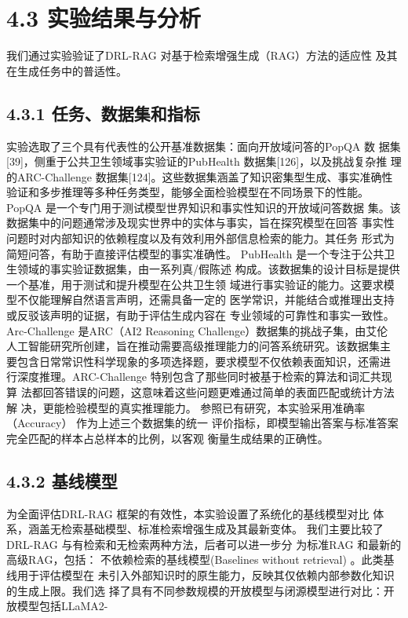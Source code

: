 \documentclass[12pt,a4paper,openright,UTF8]{ctexbook}
\begin{document}
\section{4.3 实验结果与分析}

我们通过实验验证了DRL-RAG 对基于检索增强生成（RAG）方法的适应性 及其在生成任务中的普适性。

\subsection{4.3.1 任务、数据集和指标}

实验选取了三个具有代表性的公开基准数据集：面向开放域问答的PopQA 数 据集[39]，侧重于公共卫生领域事实验证的PubHealth 数据集[126]，以及挑战复杂推 理的ARC-Challenge 数据集[124]。这些数据集涵盖了知识密集型生成、事实准确性 验证和多步推理等多种任务类型，能够全面检验模型在不同场景下的性能。 PopQA 是一个专门用于测试模型世界知识和事实性知识的开放域问答数据 集。该数据集中的问题通常涉及现实世界中的实体与事实，旨在探究模型在回答 事实性问题时对内部知识的依赖程度以及有效利用外部信息检索的能力。其任务 形式为简短问答，有助于直接评估模型的事实准确性。 PubHealth 是一个专注于公共卫生领域的事实验证数据集，由一系列真/假陈述 构成。该数据集的设计目标是提供一个基准，用于测试和提升模型在公共卫生领 域进行事实验证的能力。这要求模型不仅能理解自然语言声明，还需具备一定的 医学常识，并能结合或推理出支持或反驳该声明的证据，有助于评估生成内容在 专业领域的可靠性和事实一致性。 Arc-Challenge 是ARC（AI2 Reasoning Challenge）数据集的挑战子集，由艾伦 人工智能研究所创建，旨在推动需要高级推理能力的问答系统研究。该数据集主 要包含日常常识性科学现象的多项选择题，要求模型不仅依赖表面知识，还需进 行深度推理。ARC-Challenge 特别包含了那些同时被基于检索的算法和词汇共现算 法都回答错误的问题，这意味着这些问题更难通过简单的表面匹配或统计方法解 决，更能检验模型的真实推理能力。 参照已有研究，本实验采用准确率（Accuracy） 作为上述三个数据集的统一 评价指标，即模型输出答案与标准答案完全匹配的样本占总样本的比例，以客观 衡量生成结果的正确性。

\subsection{4.3.2 基线模型}

为全面评估DRL-RAG 框架的有效性，本实验设置了系统化的基线模型对比 体系，涵盖无检索基础模型、标准检索增强生成及其最新变体。 我们主要比较了DRL-RAG 与有检索和无检索两种方法，后者可以进一步分 为标准RAG 和最新的高级RAG，包括： 不依赖检索的基线模型(Baselines without retrieval) 。此类基线用于评估模型在 未引入外部知识时的原生能力，反映其仅依赖内部参数化知识的生成上限。我们选 择了具有不同参数规模的开放模型与闭源模型进行对比：开放模型包括LLaMA2-
\end{document}
